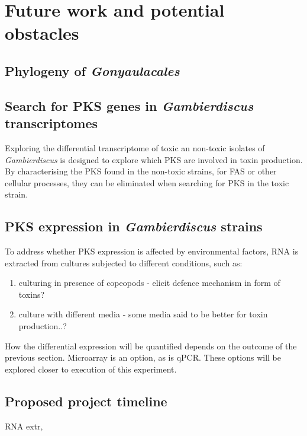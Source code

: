 \documentclass[12pt]{article}
\begin{document}




\section{Future work and potential obstacles}

\subsection{Phylogeny of \emph{Gonyaulacales}}

\subsection{Search for PKS genes in \emph{Gambierdiscus} transcriptomes}
Exploring the differential transcriptome of toxic an non-toxic isolates of \emph{Gambierdiscus} is designed to explore which PKS are involved in toxin production. By characterising the PKS found in the non-toxic strains, for FAS or other cellular processes, they can be eliminated when searching for PKS in the toxic strain. 

\subsection{PKS expression in \emph{Gambierdiscus} strains}
To address whether PKS expression is affected by environmental factors, RNA is extracted from cultures subjected to different conditions, such as: 
\begin{enumerate}
\item culturing in presence of copeopods - elicit defence mechanism in form of toxins?
\item culture with different media - some media said to be better for toxin production..?
\end{enumerate}
How the differential expression will be quantified depends on the outcome of the previous section. Microarray is an option, as is qPCR. These options will be explored closer to execution of this experiment.
\subsection{Proposed project timeline}
RNA extr, 
\newpage


\end{document}
